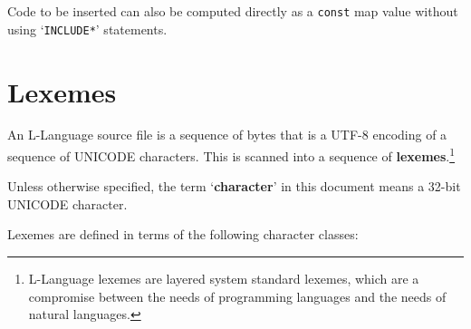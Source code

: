 \documentclass[12pt]{article}
\newcommand{\key}[1]{{\rm \bfseries #1}}
\newcommand{\skey}[2]{{\rm \bfseries #1#2}}
\begin{document}
Code to be inserted can also be computed directly as a {\tt const} map
value without using `{\tt *INCLUDE*}' statements.




\section{Lexemes}
\label{LEXEMES}

An L-Language source file is a sequence of bytes that is a UTF-8 encoding
of a sequence of UNICODE characters.  This is scanned into a sequence
of \skey{lexeme}s.\footnote{
L-Language lexemes are layered system standard
lexemes, which are a compromise between the needs of programming languages
and the needs of natural languages.}

Unless otherwise specified, the term `\key{character}' in this
document means a 32-bit UNICODE character.

Lexemes are defined in terms of
the following character classes:
\end{document}
